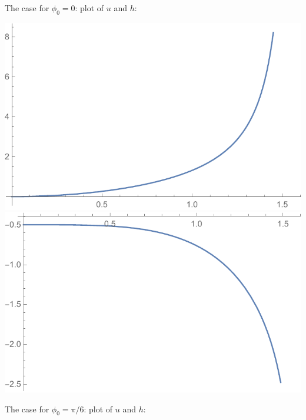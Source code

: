 \documentclass[11pt,letterpaper]{book}
\theoremstyle{definition}
\begin{document}
The case for $\phi_0 = 0$: plot of $u$ and $h$:
\begin{center}
\includegraphics[scale=0.6]{Mathematica/Hadley_cell/fig/u_0}\quad
\includegraphics[scale=0.6]{Mathematica/Hadley_cell/fig/h_0}
\end{center}
The case for $\phi_0 = \pi/6$: plot of $u$ and $h$:
\end{document}
